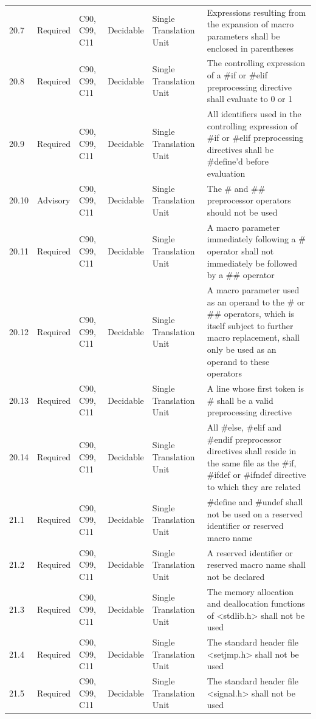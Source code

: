 \documentclass[11pt]{article}
\begin{document}
{\begin{longtable}{@{}p{1.0cm}p{1.6cm}p{1.8cm}p{2.0cm}p{1.6cm}p{7.4cm}@{}}
20.7 & Required & C90, C99, C11 & Decidable & Single Translation Unit & Expressions resulting from the expansion of macro parameters shall be enclosed in parentheses \\
20.8 & Required & C90, C99, C11 & Decidable & Single Translation Unit & The controlling expression of a \#if or \#elif preprocessing directive shall evaluate to 0 or 1 \\
20.9 & Required & C90, C99, C11 & Decidable & Single Translation Unit & All identifiers used in the controlling expression of \#if or \#elif preprocessing directives shall be \#define'd before evaluation \\
20.10 & Advisory & C90, C99, C11 & Decidable & Single Translation Unit & The \# and \#\# preprocessor operators should not be used \\
20.11 & Required & C90, C99, C11 & Decidable & Single Translation Unit & A macro parameter immediately following a \# operator shall not immediately be followed by a \#\# operator \\
20.12 & Required & C90, C99, C11 & Decidable & Single Translation Unit & A macro parameter used as an operand to the \# or \#\# operators, which is itself subject to further macro replacement, shall only be used as an operand to these operators \\
20.13 & Required & C90, C99, C11 & Decidable & Single Translation Unit & A line whose first token is \# shall be a valid preprocessing directive \\
20.14 & Required & C90, C99, C11 & Decidable & Single Translation Unit & All \#else, \#elif and \#endif preprocessor directives shall reside in the same file as the \#if, \#ifdef or \#ifndef directive to which they are related \\
21.1 & Required & C90, C99, C11 & Decidable & Single Translation Unit & \#define and \#undef shall not be used on a reserved identifier or reserved macro name \\
21.2 & Required & C90, C99, C11 & Decidable & Single Translation Unit & A reserved identifier or reserved macro name shall not be declared \\
21.3 & Required & C90, C99, C11 & Decidable & Single Translation Unit & The memory allocation and deallocation functions of <stdlib.h> shall not be used \\
21.4 & Required & C90, C99, C11 & Decidable & Single Translation Unit & The standard header file <setjmp.h> shall not be used \\
21.5 & Required & C90, C99, C11 & Decidable & Single Translation Unit & The standard header file <signal.h> shall not be used \\

\end{longtable}}
\end{document}
